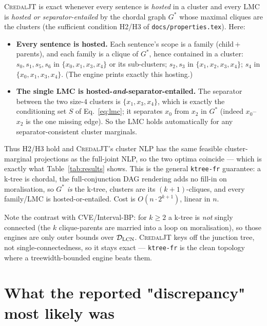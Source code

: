 \documentclass[11pt]{article}
\begin{document}
\textsc{CredalJT} is exact whenever every sentence is \emph{hosted} in a cluster
and every LMC is \emph{hosted or separator-entailed} by the chordal graph
$G^\ast$ whose maximal cliques are the clusters (the sufficient condition H2/H3
of \texttt{docs/properties.tex}). Here:
\begin{itemize}
\item \textbf{Every sentence is hosted.} Each sentence's scope is a family
(child\,$+$\,parents), and each family is a clique of $G^\ast$, hence contained
in a cluster: $s_0,s_1,s_5,s_6$ in $\{x_0,x_1,x_3,x_4\}$ or its sub-clusters;
$s_2,s_3$ in $\{x_1,x_2,x_3,x_4\}$; $s_4$ in $\{x_0,x_1,x_3,x_4\}$. (The engine
prints exactly this hosting.)
\item \textbf{The single LMC is hosted-\emph{and}-separator-entailed.} The
separator between the two size-$4$ clusters is $\{x_1,x_3,x_4\}$, which is
exactly the conditioning set $S$ of Eq.~\eqref{eq:lmc}; it separates $x_0$ from
$x_2$ in $G^\ast$ (indeed $x_0$--$x_2$ is the one missing edge). So the LMC holds
automatically for any separator-consistent cluster marginals.
\end{itemize}
Thus H2/H3 hold and \textsc{CredalJT}'s cluster NLP has the same feasible
cluster-marginal projections as the full-joint NLP, so the two optima coincide
--- which is exactly what Table~\ref{tab:results} shows. This is the general
\texttt{ktree-fr} guarantee: a k-tree is chordal, the full-conjunction DAG
rendering adds no fill-in on moralisation, so $G^\ast$ \emph{is} the k-tree,
clusters are its $(k{+}1)$-cliques, and every family/LMC is hosted-or-entailed.
Cost is $O(n\cdot 2^{k+1})$, linear in $n$.

Note the contrast with CVE/Interval-BP: for $k\ge 2$ a k-tree is \emph{not}
singly connected (the $k$ clique-parents are married into a loop on
moralisation), so those engines are only outer bounds over $\mathcal{D}_{\rm
LCN}$. \textsc{CredalJT} keys off the junction tree, not single-connectedness,
so it stays exact --- \texttt{ktree-fr} is the clean topology where a
treewidth-bounded engine beats them.

\section{What the reported "discrepancy" most likely was}
\label{sec:discrepancy}
\end{document}
